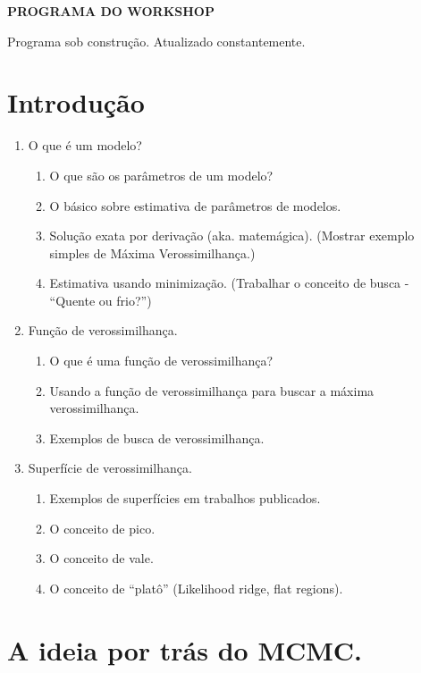 \documentclass[10pt,a4paper]{article}
\begin{document}
\begin{center}
{\LARGE \textbf{PROGRAMA DO WORKSHOP}}
\end{center}

Programa sob construção. Atualizado constantemente.

\section{Introdução}

\begin{enumerate}
\item O que é um modelo?

	\begin{enumerate}
	\item O que são os parâmetros de um modelo?
	\item O básico sobre estimativa de parâmetros de modelos.
	\item Solução exata por derivação (aka. matemágica). (Mostrar exemplo simples de Máxima Verossimilhança.)
	\item Estimativa usando minimização. (Trabalhar o conceito de busca - “Quente ou frio?”)
	\end{enumerate}
	
\item Função de verossimilhança.
	\begin{enumerate}
	\item O que é uma função de verossimilhança?
	\item Usando a função de verossimilhança para buscar a máxima verossimilhança.
	\item Exemplos de busca de verossimilhança.
	\end{enumerate}
	
\item Superfície de verossimilhança.
	\begin{enumerate}
	\item Exemplos de superfícies em trabalhos publicados.
	\item O conceito de pico.
	\item O conceito de vale.
	\item O conceito de “platô” (Likelihood ridge, flat regions).
	\end{enumerate}	
	
\end{enumerate}

\section{A ideia por trás do MCMC.}
\end{document}
